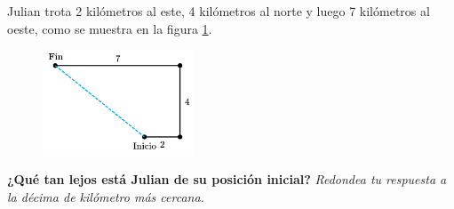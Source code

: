 Julian trota 2 kilómetros al este, 4 kilómetros al norte y luego 7 kilómetros al oeste,
como se muestra en la figura \ref{fig:des_pitagoras_08}.

\begin{figure}[H]
    \begin{center}
        \includegraphics[width=0.4\textwidth]{../images/des_pitagoras_08.png}
    \end{center}
    \caption{}
    \label{fig:des_pitagoras_08}
\end{figure}

\textbf{¿Qué tan lejos está Julian de su posición inicial?}
\textit{Redondea tu respuesta a la décima de kilómetro más cercana.}
